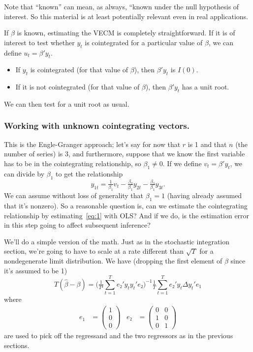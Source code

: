 Note that ``known'' can mean, as always, ``known under the null
hypothesis of interest.  So this material is at least potentially
relevant even in real applications.

If $\beta$ is known, estimating the VECM is completely straightforward.
If it is of interest to test whether $y_t$ is cointegrated for a
particular value of $\beta$, we can define $u_t = \beta'y_t$.
\begin{itemize}
\item If $y_t$ is cointegrated (for that value of $\beta$), then $\beta'y_t$
  is $I(0)$.
\item If it is not cointegrated (for that value of $\beta$), then $\beta'y_t$
  has a unit root.
\end{itemize}
We can then test for a unit root as usual.

\subsubsection{Working with unknown cointegrating vectors.}

This is the Engle-Granger approach; let's say for now that $r$ is 1
and that $n$ (the number of series) is 3, and furthermore, suppose
that we know the first variable has to be in the cointegrating
relationship, so $\beta_1 \neq 0$.  If we define $v_t = \beta'y_t$, we can divide
by $\beta_1$ to get the relationship
\begin{equation}\label{eq:1}
  y_{1t} = \tfrac{1}{\beta_1} v_t - \tfrac{\beta₂}{\beta_1} y_{2t} - \tfrac{\beta₃}{\beta_1} y_{3t}.
\end{equation}
We can assume without loss of generality that $\beta_1=1$ (having already
assumed that it's nonzero).  So a reasonable question is, can we
estimate the cointegrating relationship by estimating~\eqref{eq:1}
with OLS?  And if we do, is the estimation error in this step going to
affect subsequent inference?

We'll do a simple version of the math.  Just as in the stochastic
integration section, we're going to have to scale at a rate different
than $\sqrt{T}$ for a nondegenerate limit distribution.  We have
(dropping the first element of $\beta$ since it's assumed to be 1)
\begin{equation*}
  T(\hat \beta - \beta)
  = \Big( \tfrac{1}{T²} \sum_{t=1}^T e₂'y_t y_t'e₂ \Big)^{-1}
    \tfrac{1}{T} \sum_{t=1}^T e₂'y_t \Delta y_t'e_1
\end{equation*}
where
\begin{align*}
  e_1 &= \begin{pmatrix} 1 \\ 0 \\ 0 \end{pmatrix} &
  e₂ &= \begin{pmatrix} 0 & 0 \\ 1 & 0 \\ 0 & 1 \end{pmatrix}
\end{align*}
are used to pick off the regressand and the two regressors as in the
previous sections.

